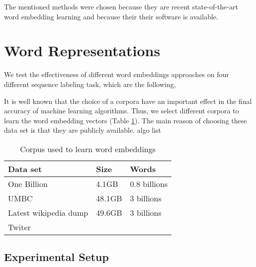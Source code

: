 \documentclass[11pt]{article}
\begin{document}
The mentioned methods were chosen because they are recent state-of-the-art word embedding learning and because their their software is available.



\section{Word Representations}
We test the effectiveness of different word embeddings approaches on four different sequence labeling task, which are the following, 




It is well known that the choice of a corpora have an important effect in the final accuracy of machine learning algorithms. 
Thus, we select different corpora to learn the word embedding vectors (Table \ref{corpus}).
The main reason of choosing these data set is that they are publicly available. 
algo list

\begin{table}[h]
\begin{center}
\begin{small}
\begin{tabular}{lll}
\hline
\textbf{Data set} & \textbf{Size} & \textbf{Words} \\ \hline
One Billion 	& 4.1GB & 0.8 billions  \\
UMBC 	& 48.1GB & 3 billions \\
Latest wikipedia dump & 49.6GB & 3 billions \\
Twiter & &  \\ \hline
\end{tabular}
\end{small}
\label{corpus}
\caption{Corpus used to learn word embeddings}
\end{center}
\end{table}

\subsection{Experimental Setup}
\end{document}
